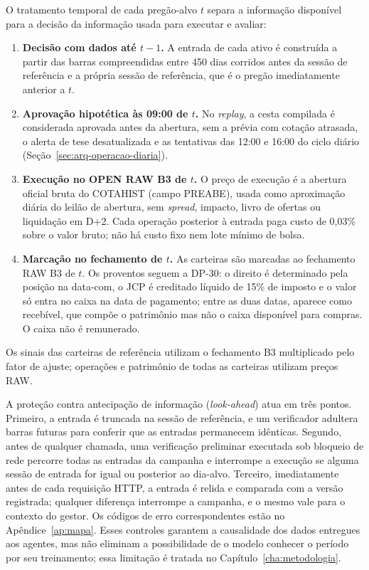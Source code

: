 O tratamento temporal de cada pregão-alvo $t$ separa a informação disponível para a decisão da informação usada para executar e avaliar:

\begin{enumerate}
  \item \textbf{Decisão com dados até $t-1$.} A entrada de cada ativo é construída a partir das barras compreendidas entre 450 dias corridos antes da sessão de referência e a própria sessão de referência, que é o pregão imediatamente anterior a $t$.  \item \textbf{Aprovação hipotética às 09:00 de $t$.} No \textit{replay}, a cesta compilada é considerada aprovada antes da abertura, sem a prévia com cotação atrasada, o alerta de tese desatualizada e as tentativas das 12:00 e 16:00 do ciclo diário (Seção~\ref{sec:arq-operacao-diaria}).
  \item \textbf{Execução no OPEN RAW B3 de $t$.} O preço de execução é a abertura oficial bruta do COTAHIST (campo PREABE), usada como aproximação diária do leilão de abertura, sem \textit{spread}, impacto, livro de ofertas ou liquidação em D+2. Cada operação posterior à entrada paga custo de 0,03\% sobre o valor bruto; não há custo fixo nem lote mínimo de bolsa.
  \item \textbf{Marcação no fechamento de $t$.} As carteiras são marcadas ao fechamento RAW B3 de $t$. Os proventos seguem a \mbox{DP-30}: o direito é determinado pela posição na data-com, o JCP é creditado líquido de 15\% de imposto e o valor só entra no caixa na data de pagamento; entre as duas datas, aparece como recebível, que compõe o patrimônio mas não o caixa disponível para compras. O caixa não é remunerado.
\end{enumerate}

Os sinais das carteiras de referência utilizam o fechamento B3 multiplicado pelo fator de ajuste; operações e patrimônio de todas as carteiras utilizam preços RAW.

A proteção contra antecipação de informação (\textit{look-ahead}) atua em três pontos. Primeiro, a entrada é truncada na sessão de referência, e um verificador adultera barras futuras para conferir que as entradas permanecem idênticas. Segundo, antes de qualquer chamada, uma verificação preliminar executada sob bloqueio de rede percorre todas as entradas da campanha e interrompe a execução se alguma sessão de entrada for igual ou posterior ao dia-alvo. Terceiro, imediatamente antes de cada requisição HTTP, a entrada é relida e comparada com a versão registrada; qualquer diferença interrompe a campanha, e o mesmo vale para o contexto do gestor. Os códigos de erro correspondentes estão no Apêndice~\ref{ap:mapa}. Esses controles garantem a causalidade dos dados entregues aos agentes, mas não eliminam a possibilidade de o modelo conhecer o período por seu treinamento; essa limitação é tratada no Capítulo~\ref{cha:metodologia}.

